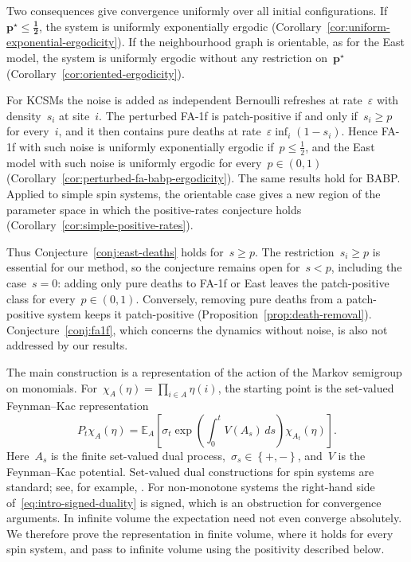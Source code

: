 \documentclass[EJP,preprint,NODS,nobera]{ejpecp}
\newcommand{\E}{\mathbb{E}}
\newcommand{\bb}[1]{\left(#1\right)}
\newcommand{\Cb}[1]{\left[#1\right]}
\newcommand{\cb}[1]{\left\{#1\right\}}
\newcommand{\mb}[1]{\mathbf{#1}}
\newcommand{\mbs}[1]{\boldsymbol{#1}}
\newcommand{\chg}[1]{{\color{changegreen}#1}}
\begin{document}
Two consequences give convergence uniformly over all initial configurations.
If~$\mb p^\star\leq\mbs{\tfrac12}$, the system is uniformly exponentially
ergodic (Corollary~\ref{cor:uniform-exponential-ergodicity}). If the
neighbourhood graph is orientable, as for the East model, the system is
uniformly ergodic without any restriction on~$\mb p^\star$
(Corollary~\ref{cor:oriented-ergodicity}).

For KCSMs the noise is added as independent Bernoulli refreshes at
rate~$\varepsilon$ with density~$s_i$ at site~$i$. The perturbed FA-1f is
patch-positive if and only if~$s_i\geq p$ for every~$i$, and it then contains
pure deaths at rate~$\varepsilon\inf_i(1-s_i)$. Hence FA-1f with such noise
is uniformly exponentially ergodic if~$p\leq\tfrac12$, and the East model
with such noise is uniformly ergodic for every~$p\in(0,1)$
(Corollary~\ref{cor:perturbed-fa-babp-ergodicity}). The same results hold for BABP. Applied to
simple spin systems, the orientable case gives a new region of the parameter
space in which the positive-rates conjecture holds
(Corollary~\ref{cor:simple-positive-rates}).

Thus Conjecture~\ref{conj:east-deaths} holds for~$s\geq p$. The
restriction~$s_i\geq p$ is essential for our method, so the conjecture
remains open for~$s<p$, including the case~$s=0$: adding only pure deaths to
FA-1f or East leaves the patch-positive class for every~$p\in(0,1)$. Conversely, removing pure deaths from a patch-positive
system keeps it patch-positive (Proposition~\ref{prop:death-removal}).
Conjecture~\ref{conj:fa1f}, which concerns the dynamics without noise, is
also not addressed by our results.

The main construction is a representation of the action of the Markov
semigroup on monomials. For~$\chi_A(\eta)=\prod_{i\in A}\eta(i)$, the
starting point is the set-valued Feynman--Kac representation
\begin{equation}
\label{eq:intro-signed-duality}
P_t\chi_A(\eta)
=
\E_A\Cb{
\sigma_t
\exp\bb{\int_0^t V(A_s)\,ds}
\chi_{A_t}(\eta)
}.
\end{equation}
Here~$A_s$ is the finite set-valued dual process,~$\sigma_s\in\cb{+,-}$, and~$V$
is the Feynman--Kac potential. Set-valued dual constructions for spin systems
are standard; see, for example,
\cite{Harris1974,Harris1978,Griffeath1979,HolleyStroock1979,Gray1986,JansenKurt2014}.
For non-monotone systems the right-hand side
of~\eqref{eq:intro-signed-duality} is signed, which is an obstruction for
convergence arguments. \chg{In infinite volume the expectation need not even
converge absolutely. We therefore prove the representation in finite volume,
where it holds for every spin system, and pass to infinite volume using the
positivity described below.}
\end{document}
